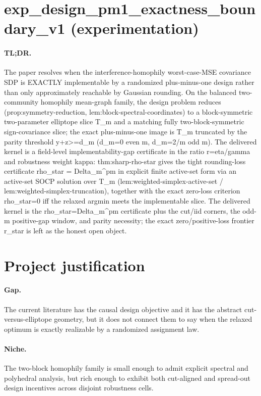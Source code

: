 \documentclass{article}
\begin{document}
\section*{exp_design_pm1_exactness_boundary_v1 (experimentation)}

\paragraph{TL;DR.} The paper resolves when the interference-homophily worst-case-MSE covariance SDP is EXACTLY implementable by a randomized plus-minus-one design rather than only approximately reachable by Gaussian rounding. On the balanced two-community homophily mean-graph family, the design problem reduces (prop:symmetry-reduction, lem:block-spectral-coordinates) to a block-symmetric two-parameter elliptope slice T_m and a matching fully two-block-symmetric sign-covariance slice; the exact plus-minus-one image is T_m truncated by the parity threshold y+z>=d_m (d_m=0 even m, d_m=2/m odd m). The delivered kernel is a field-level implementability-gap certificate in the ratio r=eta/gamma and robustness weight kappa: thm:sharp-rho-star gives the tight rounding-loss certificate rho_star = Delta_m^pm in explicit finite active-set form via an active-set SOCP solution over T_m (lem:weighted-simplex-active-set / lem:weighted-simplex-truncation), together with the exact zero-loss criterion rho_star=0 iff the relaxed argmin meets the implementable slice. The delivered kernel is the rho_star=Delta_m^pm certificate plus the cut/iid corners, the odd-m positive-gap window, and parity necessity; the exact zero/positive-loss frontier r_star is left as the honest open object.

\section{Project justification}

\paragraph{Gap.} The current literature has the causal design objective and it has the abstract cut-versus-elliptope geometry, but it does not connect them to say when the relaxed optimum is exactly realizable by a randomized assignment law.

\paragraph{Niche.} The two-block homophily family is small enough to admit explicit spectral and polyhedral analysis, but rich enough to exhibit both cut-aligned and spread-out design incentives across disjoint robustness cells.
\end{document}
